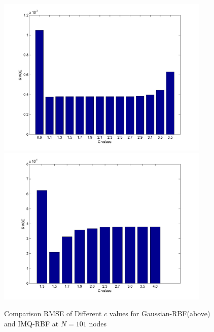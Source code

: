 \documentclass[12pt]{article}
\numberwithin{equation}{section} %
\begin{document}
\newpage
 \begin{figure}[h]
\begin{centering}
\vskip -0.5in
\includegraphics*[height=3in]{difc.png}\
\includegraphics*[height=3in]{CIMQ.png}\
\caption{Comparison RMSE of Different $c$ values for
Gaussian-RBF(above) and IMQ-RBF at $N=101$ nodes } \vskip -0.5in
\end{centering}
\end{figure}
\end{document}
